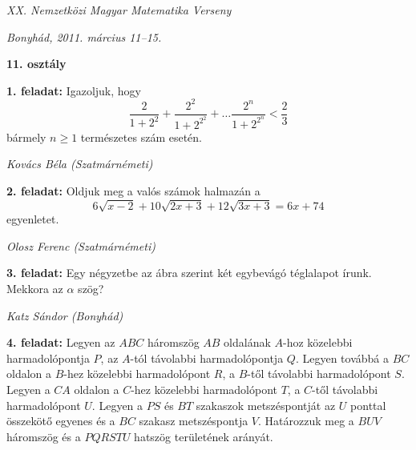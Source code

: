 \documentclass[a4paper,10pt]{article}
\newcommand{\ki}[2]{\hfill {\it #1 (#2)}\medskip}
\begin{document}
\begin{center} \Large {\em XX. Nemzetközi Magyar Matematika Verseny} \end{center}
\begin{center} \large{\em Bonyhád, 2011. március 11--15.} \end{center}
\smallskip
\begin{center} \large{\bf 11. osztály} \end{center}
\bigskip 

{\bf 1. feladat: } Igazoljuk, hogy 
\[\frac{2}{1+2^2}+\frac{2^2}{1+2^{2^2}}+\ldots\frac{2^n}{1+2^{2^n}}<\frac23\]
 bármely $n\ge1$ természetes szám esetén.

\ki{Kovács Béla}{Szatmárnémeti}\medskip

{\bf 2. feladat: } Oldjuk meg a valós számok halmazán a
\[6\sqrt{x-2}+10\sqrt{2x+3}+12\sqrt{3x+3}=6x+74\]
egyenletet.

\ki{Olosz Ferenc}{Szatmárnémeti}\medskip

{\bf 3. feladat: } Egy négyzetbe az ábra szerint két egybevágó téglalapot írunk. Mekkora az $\alpha$ szög?

\ki{Katz Sándor}{Bonyhád}\medskip

\begin{figure}[hpb]
\begin{center}
\end{center}
\end{figure}

{\bf 4. feladat: } Legyen az $ABC$ háromszög $AB$ oldalának $A$-hoz közelebbi harmadolópontja $P$, az $A$-tól távolabbi harmadolópontja $Q$. Legyen továbbá a $BC$ oldalon a $B$-hez közelebbi harmadolópont $R$, a $B$-től távolabbi harmadolópont $S$. Legyen a $CA$ oldalon a $C$-hez közelebbi harmadolópont $T$, a $C$-től távolabbi harmadolópont $U$. Legyen a $PS$ és $BT$ szakaszok metszéspontját az $U$ ponttal összekötő egyenes és a $BC$ szakasz metszéspontja $V$. Határozzuk meg a $BUV$ háromszög és a $PQRSTU$ hatszög területének arányát.
\end{document}
